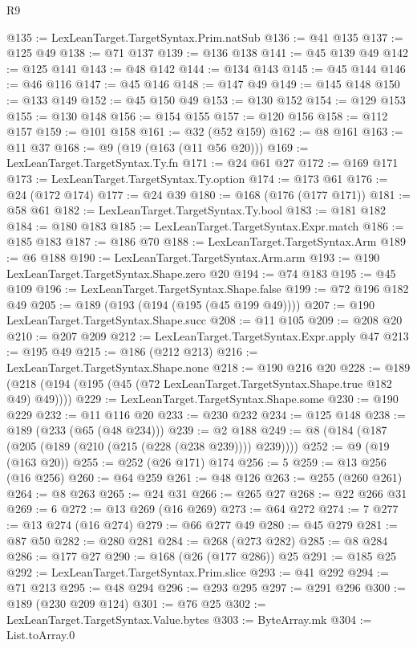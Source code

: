 \begin{lexlean}{R9}
\begin{coremodule}
{{{{{{{{{{{{{{{{{{{{{@135 := LexLeanTarget.TargetSyntax.Prim.natSub
@136 := @41 @135
@137 := @125 @49
@138 := @71 @137
@139 := @136 @138
@141 := @45 @139 @49
@142 := @125 @141
@143 := @48 @142
@144 := @134 @143
@145 := @45 @144
@146 := @46 @116
@147 := @45 @146
@148 := @147 @49
@149 := @145 @148
@150 := @133 @149
@152 := @45 @150 @49
@153 := @130 @152
@154 := @129 @153
@155 := @130 @148
@156 := @154 @155
@157 := @120 @156
@158 := @112 @157
@159 := @101 @158
@161 := @32 (@52 @159)
@162 := @8 @161
@163 := @11 @37
@168 := @9 (@19 (@163 (@11 @56 @20)))
@169 := LexLeanTarget.TargetSyntax.Ty.fn
@171 := @24 @61 @27
@172 := @169 @171
@173 := LexLeanTarget.TargetSyntax.Ty.option
@174 := @173 @61
@176 := @24 (@172 @174)
@177 := @24 @39
@180 := @168 (@176 (@177 @171))
@181 := @58 @61
@182 := LexLeanTarget.TargetSyntax.Ty.bool
@183 := @181 @182
@184 := @180 @183
@185 := LexLeanTarget.TargetSyntax.Expr.match
@186 := @185 @183
@187 := @186 @70
@188 := LexLeanTarget.TargetSyntax.Arm
@189 := @6 @188
@190 := LexLeanTarget.TargetSyntax.Arm.arm
@193 := @190 LexLeanTarget.TargetSyntax.Shape.zero @20
@194 := @74 @183
@195 := @45 @109
@196 := LexLeanTarget.TargetSyntax.Shape.false
@199 := @72 @196 @182 @49
@205 := @189 (@193 (@194 (@195 (@45 @199 @49))))
@207 := @190 LexLeanTarget.TargetSyntax.Shape.succ
@208 := @11 @105
@209 := @208 @20
@210 := @207 @209
@212 := LexLeanTarget.TargetSyntax.Expr.apply @47
@213 := @195 @49
@215 := @186 (@212 @213)
@216 := LexLeanTarget.TargetSyntax.Shape.none
@218 := @190 @216 @20
@228 := @189 (@218 (@194 (@195 (@45 (@72 LexLeanTarget.TargetSyntax.Shape.true @182 @49) @49))))
@229 := LexLeanTarget.TargetSyntax.Shape.some
@230 := @190 @229
@232 := @11 @116 @20
@233 := @230 @232
@234 := @125 @148
@238 := @189 (@233 (@65 (@48 @234)))
@239 := @2 @188
@249 := @8 (@184 (@187 (@205 (@189 (@210 (@215 (@228 (@238 @239)))) @239))))
@252 := @9 (@19 (@163 @20))
@255 := @252 (@26 @171) @174
@256 := 5
@259 := @13 @256 (@16 @256)
@260 := @64 @259
@261 := @48 @126
@263 := @255 (@260 @261)
@264 := @8 @263
@265 := @24 @31
@266 := @265 @27
@268 := @22 @266 @31
@269 := 6
@272 := @13 @269 (@16 @269)
@273 := @64 @272
@274 := 7
@277 := @13 @274 (@16 @274)
@279 := @66 @277 @49
@280 := @45 @279
@281 := @87 @50
@282 := @280 @281
@284 := @268 (@273 @282)
@285 := @8 @284
@286 := @177 @27
@290 := @168 (@26 (@177 @286)) @25
@291 := @185 @25
@292 := LexLeanTarget.TargetSyntax.Prim.slice
@293 := @41 @292
@294 := @71 @213
@295 := @48 @294
@296 := @293 @295
@297 := @291 @296
@300 := @189 (@230 @209 @124)
@301 := @76 @25
@302 := LexLeanTarget.TargetSyntax.Value.bytes
@303 := ByteArray.mk
@304 := List.toArray.{0}
}}}}}}}}}}}}}}}}}}}}}
\end{coremodule}
\end{lexlean}
